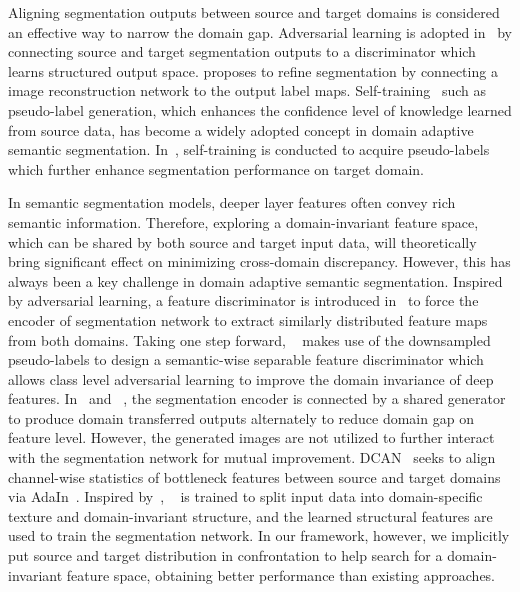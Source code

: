 \documentclass{bmvc2k}
\begin{document}
 Aligning segmentation outputs between source and target domains is considered an effective way to narrow the domain gap. Adversarial learning is adopted in~\cite{tsai2018learning,vu2019advent} by connecting source and target segmentation outputs to a discriminator which learns structured output space. \cite{yang2020label} proposes to refine segmentation by connecting a image reconstruction network to the output label maps.  Self-training~\cite{chapelle2009semi,zhu2005semi} such as pseudo-label generation, which enhances the confidence level of knowledge learned from source data, has become a widely adopted concept in domain adaptive semantic segmentation. In~\cite{choi2019self,du2019ssf,kim2020learning,li2019bidirectional,pan2020unsupervised,zou2018unsupervised,zou2019confidence}, self-training is conducted to acquire pseudo-labels which further enhance segmentation performance on target domain.



In semantic segmentation models, deeper layer features often convey rich semantic information. Therefore, exploring a domain-invariant feature space, which can be shared by both source and target input data, will theoretically bring significant effect on minimizing cross-domain discrepancy. However, this has always been a key challenge in domain adaptive semantic segmentation. Inspired by adversarial learning, a feature discriminator is introduced in~\cite{hoffman2018cycada} to force the encoder of segmentation network to extract similarly distributed feature maps from both domains. Taking one step forward, ~\cite{du2019ssf} makes use of the downsampled pseudo-labels to design a semantic-wise separable feature discriminator which allows class level adversarial learning to improve the domain invariance of deep features. In~\cite{sankaranarayanan2018learning} and ~\cite{zhu2018penalizing}, the segmentation encoder is connected by a shared generator to produce domain transferred outputs alternately to reduce domain gap on feature level. However, the generated images are not utilized to further interact with the segmentation network for mutual improvement.  
DCAN~\cite{wu2018dcan} seeks to align channel-wise statistics of bottleneck features between source and target domains via AdaIn~\cite{huang2017arbitrary}.
Inspired by~\cite{huang2018multimodal}, ~\cite{chang2019all} is trained to split input data into domain-specific texture and domain-invariant structure, and the learned structural features are used to train the segmentation network. In our framework, however, we implicitly put source and target distribution in confrontation to help search for a domain-invariant feature space, obtaining better performance than existing approaches. 
\end{document}
